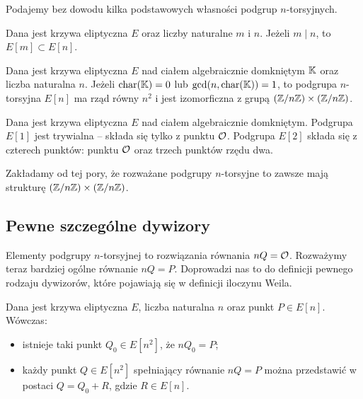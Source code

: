 \noindent
Podajemy bez dowodu kilka podstawowych własności podgrup $n$-torsyjnych.

\begin{fact}
Dana jest krzywa eliptyczna $E$
oraz liczby naturalne $m$ i $n$.
Jeżeli $m \mid n$, to $E[m] \subset E[n]$.
\end{fact}

\begin{theorem}\label{torsion_subgroup_isomorphic_zn_zn}
Dana jest krzywa eliptyczna $E$ nad ciałem algebraicznie domkniętym $\mathbb{K}$
oraz liczba naturalna $n$.
Jeżeli $\operatorname{char}(\mathbb{K}) = 0$ lub $\gcd(n, \operatorname{char}(\mathbb{K})) = 1$,
to podgrupa $n$-torsyjna $E[n]$ ma rząd równy $n^2$
i jest izomorficzna z grupą $(\mathbb{Z} / n\mathbb{Z})\times(\mathbb{Z} / n\mathbb{Z})$.
\end{theorem}

\begin{corollary}
Dana jest krzywa eliptyczna $E$ nad ciałem algebraicznie domkniętym.
Podgrupa $E[1]$ jest trywialna -- składa się tylko z punktu $\mathcal{O}$.
Podgrupa $E[2]$ składa się z czterech punktów:
punktu $\mathcal{O}$ oraz trzech punktów rzędu dwa.
\end{corollary}

\begin{remark}
Zakładamy od tej pory,
że rozważane podgrupy $n$-torsyjne
to zawsze mają strukturę $(\mathbb{Z} / n\mathbb{Z}) \times (\mathbb{Z} / n\mathbb{Z})$.
\end{remark}

\subsection*{Pewne szczególne dywizory}

\noindent
Elementy podgrupy $n$-torsyjnej to rozwiązania równania $nQ = \mathcal{O}$.
Rozważymy teraz bardziej ogólne równanie $nQ = P$.
Doprowadzi nas to do definicji pewnego rodzaju dywizorów,
które pojawiają się w definicji iloczynu Weila.

\begin{theorem}
Dana jest krzywa eliptyczna $E$,
liczba naturalna $n$
oraz punkt $P \in E[n]$.
Wówczas:
\begin{itemize}
\item istnieje taki punkt $Q_0 \in E[n^2]$, że $nQ_0 = P$;
\item każdy punkt $Q \in E[n^2]$ spełniający równanie
$nQ = P$ można przedstawić w postaci $Q = Q_0 + R$,
gdzie $R \in E[n]$.
\end{itemize}
\end{theorem}


